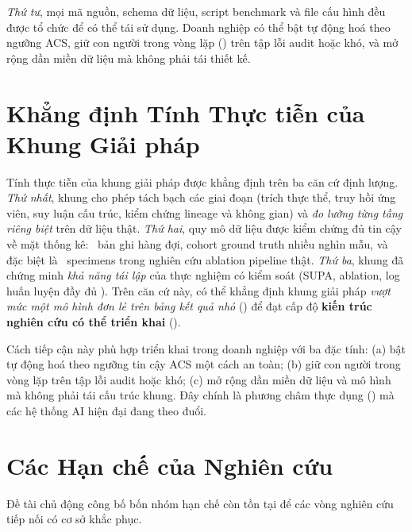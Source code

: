 \emph{Thứ tư}, mọi mã nguồn, schema dữ liệu, script benchmark và file cấu hình đều được tổ chức để có thể tái sử dụng. Doanh nghiệp có thể bật tự động hoá theo ngưỡng ACS, giữ con người trong vòng lặp () trên tập lỗi audit hoặc  khó, và mở rộng dần miền dữ liệu mà không phải tái thiết kế.

\section{Khẳng định Tính Thực tiễn của Khung Giải pháp}
\label{sec:concl-practical-affirm}

Tính thực tiễn của khung giải pháp được khẳng định trên ba căn cứ định lượng. \emph{Thứ nhất}, khung cho phép tách bạch các giai đoạn (trích thực thể, truy hồi ứng viên, suy luận cấu trúc, kiểm chứng lineage và không gian) và \emph{đo lường từng tầng riêng biệt} trên dữ liệu thật. \emph{Thứ hai}, quy mô dữ liệu được kiểm chứng đủ tin cậy về mặt thống kê: \VNAIGENAuditQueueTotal\, bản ghi hàng đợi, cohort ground truth nhiều nghìn mẫu, và đặc biệt là \VNAIABLATIONTotalSpecimens\, specimens trong nghiên cứu ablation pipeline thật. \emph{Thứ ba}, khung đã chứng minh \emph{khả năng tái lập} của thực nghiệm có kiểm soát (SUPA, ablation, log huấn luyện đầy đủ ). Trên căn cứ này, có thể khẳng định khung giải pháp \emph{vượt mức một mô hình đơn lẻ trên bảng kết quả nhỏ} () để đạt cấp độ \textbf{kiến trúc nghiên cứu có thể triển khai} ().

Cách tiếp cận này phù hợp triển khai trong doanh nghiệp với ba đặc tính: (a) bật tự động hoá theo ngưỡng tin cậy ACS một cách an toàn; (b) giữ con người trong vòng lặp trên tập lỗi audit hoặc  khó; (c) mở rộng dần miền dữ liệu và mô hình mà không phải tái cấu trúc khung. Đây chính là phương châm thực dụng () mà các hệ thống AI hiện đại đang theo đuổi.

\section{Các Hạn chế của Nghiên cứu}
\label{sec:concl-limitations}

Đề tài chủ động công bố bốn nhóm hạn chế còn tồn tại để các vòng nghiên cứu tiếp nối có cơ sở khắc phục.

